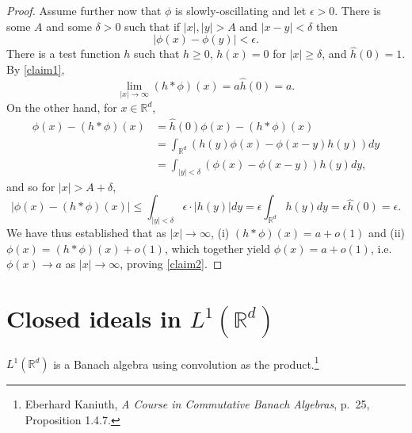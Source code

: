 \documentclass{article}
\theoremstyle{definition}
\begin{document}
\begin{proof}
Assume further now that $\phi$ is slowly-oscillating and let $\epsilon>0$. There is some $A$ and some $\delta>0$ such that
if $|x|,|y|>A$ and $|x-y|<\delta$ then
\[
|\phi(x)-\phi(y)|<\epsilon.
\]
There is a test function $h$ such that $h \geq 0$, $h(x)=0$ for $|x| \geq \delta$, and $\hat{h}(0)=1$.  By \eqref{claim1}, 
\[
\lim_{|x| \to \infty} (h*\phi)(x) = a \hat{h}(0) = a.
\]
On the other hand, for $x \in \mathbb{R}^d$,
\begin{align*}
\phi(x)-(h*\phi)(x)&= \hat{h}(0) \phi(x) - (h*\phi)(x) \\
& = \int_{\mathbb{R}^d}  (h(y) \phi(x) -\phi(x-y) h(y)) dy\\
&=\int_{|y|<\delta} (\phi(x)-\phi(x-y)) h(y) dy,
\end{align*}
and so for $|x|>A+\delta$,
\[
|\phi(x)-(h*\phi)(x)| \leq \int_{|y| < \delta} \epsilon \cdot  |h(y)| dy= \epsilon \int_{\mathbb{R}^d} h(y) dy = \epsilon \hat{h}(0) = \epsilon.
\]
We have thus established that as $|x| \to \infty$, (i) $(h*\phi)(x) = a +o(1)$ and (ii) $\phi(x)=(h*\phi)(x)+o(1)$, which together yield
$\phi(x)=a+o(1)$, i.e. $\phi(x) \to a$ as $|x| \to \infty$, proving \eqref{claim2}.
\end{proof}


\section{Closed ideals in $L^1(\mathbb{R}^d)$}
$L^1(\mathbb{R}^d)$ is a Banach algebra using convolution as the product.\footnote{Eberhard Kaniuth, {\em A Course in Commutative Banach Algebras},
p.~25, Proposition 1.4.7.}
\end{document}
